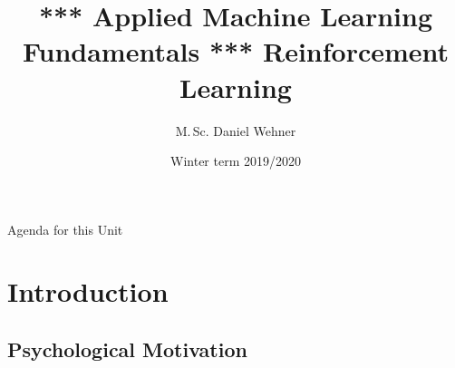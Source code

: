 


\title[Reinforcement Learning]{*** Applied Machine Learning Fundamentals *** Reinforcement Learning}
\author{M.\,Sc. Daniel Wehner}
\date{Winter term 2019/2020}




\maketitlepage




\begin{frame}{Agenda for this Unit}
	\begin{multicols}{2}
		\tableofcontents
	\end{multicols}
\end{frame}


\section{Introduction}

\subsection{Psychological Motivation}

